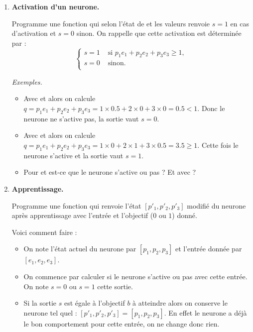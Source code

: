 \documentclass[11pt,class=report,crop=false]{standalone}
\begin{document}
\bigskip



\begin{activite}[Neurone]
	
	

\begin{enumerate}
	\item \textbf{Activation d'un neurone.}
	
	Programme une fonction 
	qui selon l'état de  et les valeurs 
	 renvoie $s=1$ en cas d'activation et $s=0$ sinon.
	On rappelle que cette activation est déterminée par :
	$$\left\{ 
	\begin{array}{rl}
	s=1  & \text{ si } p_1 e_1 + p_2e_2+p_3e_3 \ge 1, \\ 	
	s=0 & \text{ sinon.}\\
	\end{array}
	\right.$$ 
	
	\emph{Exemples.}
	\begin{itemize}
		\item Avec  et  alors
		on calcule $q = p_1 e_1 + p_2e_2+p_3e_3 = 1\times 0.5+2 \times 0 + 3\times 0 = 0.5 < 1$.
		Donc le neurone ne s'active pas, la sortie vaut $s=0$.
		
		\item Avec  et  alors
on calcule $q = p_1 e_1 + p_2e_2+p_3e_3 = 1\times 0 +2 \times 1 + 3\times 0.5 = 3.5 \ge 1$.
Cette fois le neurone s'active et la sortie vaut $s=1$.

		\item Pour  et  est-ce que le neurone s'active ou pas ? Et avec  ?
	\end{itemize}
	
	\item \textbf{Apprentissage.}
	
	Programme une fonction  qui renvoie l'état $[p'_1,p'_2,p'_3]$ modifié du neurone
	après apprentissage avec l'entrée et l'objectif ($0$ ou $1$) donné.
	
	Voici comment faire :
	\begin{itemize}
		\item On note l'état actuel du neurone par $[p_1,p_2,p_3]$ et l'entrée donnée par $[e_1,e_2,e_3]$.
		\item On commence par calculer si le neurone s'active ou pas avec cette entrée. On note $s=0$ ou $s=1$ cette sortie.
		\item Si la sortie $s$ est égale à l'objectif $b$ à atteindre alors on conserve le neurone tel quel : 
		$[p'_1,p'_2,p'_3] = [p_1,p_2,p_3]$. En effet le neurone a déjà le bon comportement pour cette entrée, on ne change donc rien.
		

\end{itemize}
\end{enumerate}
\end{activite}
\end{document}
